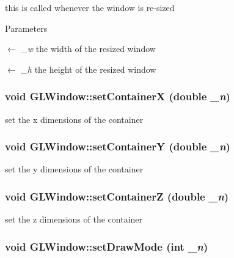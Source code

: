 this is called whenever the window is re-\/sized 
\begin{DoxyParams}{Parameters}
\item[\mbox{$\leftarrow$} {\em \_\-w}]the width of the resized window \item[\mbox{$\leftarrow$} {\em \_\-h}]the height of the resized window \end{DoxyParams}
\hypertarget{classGLWindow_a76dc832a67b98c35c2fc0665a4cc8bb3}{
\subsubsection[{setContainerX}]{\setlength{\rightskip}{0pt plus 5cm}void GLWindow::setContainerX (double {\em \_\-n})}}
\label{classGLWindow_a76dc832a67b98c35c2fc0665a4cc8bb3}


set the x dimensions of the container \hypertarget{classGLWindow_a283b661c79a468a57fcc215b1a285810}{
\subsubsection[{setContainerY}]{\setlength{\rightskip}{0pt plus 5cm}void GLWindow::setContainerY (double {\em \_\-n})}}
\label{classGLWindow_a283b661c79a468a57fcc215b1a285810}


set the y dimensions of the container \hypertarget{classGLWindow_affc726d666957d1b07718626bb00bcd8}{
\subsubsection[{setContainerZ}]{\setlength{\rightskip}{0pt plus 5cm}void GLWindow::setContainerZ (double {\em \_\-n})}}
\label{classGLWindow_affc726d666957d1b07718626bb00bcd8}


set the z dimensions of the container \hypertarget{classGLWindow_a1d5f9891101b89f3d220c44b7fa5d68d}{
\subsubsection[{setDrawMode}]{\setlength{\rightskip}{0pt plus 5cm}void GLWindow::setDrawMode (int {\em \_\-n})}}
\label{classGLWindow_a1d5f9891101b89f3d220c44b7fa5d68d}


